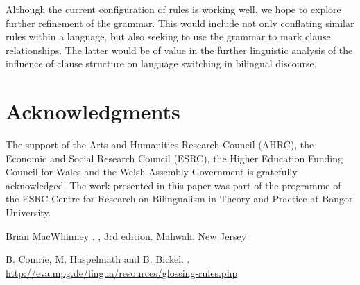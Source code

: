 \documentclass[11pt]{article}
\begin{document}
Although the current configuration of rules is working well, we hope to explore further refinement of the grammar.  This would include not only conflating similar rules within a language, but also seeking to use the grammar to mark clause relationships.  The latter would be of value in the further linguistic analysis of the influence of clause structure on language switching in bilingual discourse.


\section*{Acknowledgments}

The support of the Arts and Humanities Research Council (AHRC), the Economic and
Social Research Council (ESRC), the Higher Education Funding Council for Wales and the
Welsh Assembly Government is gratefully acknowledged. The work presented in this paper
was part of the programme of the ESRC Centre for Research on Bilingualism in Theory and
Practice at Bangor University.


%
%

\begin{thebibliography}{}

Brian MacWhinney
.
, 3rd edition.
\newblock Mahwah, New Jersey

B. Comrie, M. Haspelmath and B. Bickel.
.
\newblock \url{http://eva.mpg.de/lingua/resources/glossing-rules.php}

\end{thebibliography}
\end{document}
